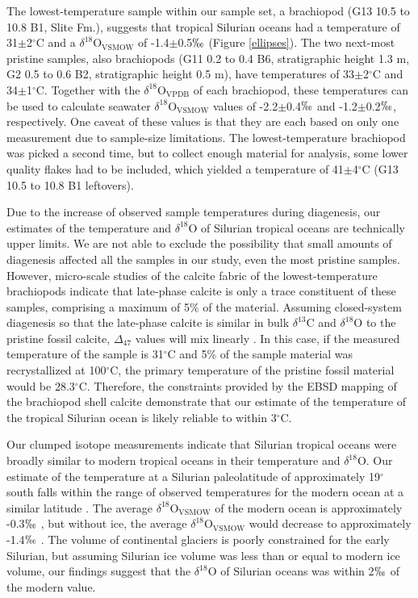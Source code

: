 \documentclass[5p, authoryear]{elsarticle}
\begin{document}
The lowest-temperature sample within our sample set, a brachiopod (G13 10.5 to 10.8 B1, Slite Fm.), suggests that tropical Silurian oceans had a temperature of 31$\pm$2$^{\circ}$C and a $\delta^{18}$O$_{\text{VSMOW}}$ of -1.4$\pm$0.5$\permil$ (Figure \ref{ellipses}). The two next-most pristine samples, also brachiopods (G11 0.2 to 0.4 B6, stratigraphic height 1.3 m, G2 0.5 to 0.6 B2, stratigraphic height 0.5 m), have temperatures of 33$\pm$2$^{\circ}$C and 34$\pm$1$^{\circ}$C. Together with the $\delta^{18}$O$_{\text{VPDB}}$ of each brachiopod, these temperatures can be used to calculate seawater $\delta^{18}$O$_{\text{VSMOW}}$ values of -2.2$\pm$0.4$\permil$ and -1.2$\pm$0.2$\permil$, respectively. One caveat of these values is that they are each based on only one measurement due to sample-size limitations. The lowest-temperature brachiopod was picked a second time, but to collect enough material for analysis, some lower quality flakes had to be included, which yielded a temperature of 41$\pm$4$^{\circ}$C (G13 10.5 to 10.8 B1 leftovers). 

Due to the increase of observed sample temperatures during diagenesis, our estimates of the temperature and $\delta^{18}$O of Silurian tropical oceans are technically upper limits. We are not able to exclude the possibility that small amounts of diagenesis affected all the samples in our study, even the most pristine samples. However, micro-scale studies of the calcite fabric of the lowest-temperature brachiopods indicate that late-phase calcite is only a trace constituent of these samples, comprising a maximum of 5\% of the material. Assuming closed-system diagenesis so that the late-phase calcite is similar in bulk $\delta^{13}$C and $\delta^{18}$O to the pristine fossil calcite, $\Delta_{47}$ values will mix linearly \citep{Affek2006}. In this case, if the measured temperature of the sample is 31$^{\circ}$C and 5\% of the sample material was recrystallized at 100$^{\circ}$C, the primary temperature of the pristine fossil material would be 28.3$^{\circ}$C. Therefore, the constraints provided by the EBSD mapping of the brachiopod shell calcite demonstrate that our estimate of the temperature of the tropical Silurian ocean is likely reliable to within 3$^{\circ}$C.

Our clumped isotope measurements indicate that Silurian tropical oceans were broadly similar to modern tropical oceans in their temperature and $\delta^{18}$O. Our estimate of the temperature at a Silurian paleolatitude of approximately 19$^{\circ}$ south \citep{Torsvik1992} falls within the range of observed temperatures for the modern ocean at a similar latitude \citep{Reynolds1994}. The average $\delta^{18}$O$_{\text{VSMOW}}$ of the modern ocean is approximately -0.3$\permil$ \citep{Shackleton1974}, but without ice, the average $\delta^{18}$O$_{\text{VSMOW}}$ would decrease to approximately -1.4$\permil$ \citep{Lhomme2005}. The volume of continental glaciers is poorly constrained for the early Silurian, but assuming Silurian ice volume was less than or equal to modern ice volume, our findings suggest that the $\delta^{18}$O of Silurian oceans was within 2$\permil$ of the modern value. 
\end{document}
